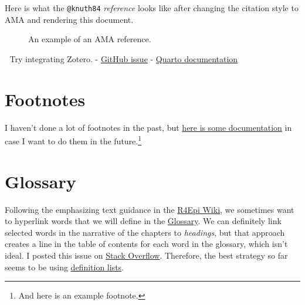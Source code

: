 \documentclass[
  letterpaper,
  DIV=11,
  numbers=noendperiod]{scrreprt}
\begin{document}
Here is what the \texttt{@knuth84} \emph{reference} looks like after
changing the citation style to AMA and rendering this document.

\begin{figure}


\caption{\label{fig-ama-reference}An example of an AMA reference.}

\end{figure}%

🔴 Try integrating Zotero. -
\href{https://github.com/orgs/brad-cannell/projects/3/views/4?pane=issue&itemId=75494998}{GitHub
issue} -
\href{https://quarto.org/docs/visual-editor/options.html\#citation-options}{Quarto
documentation}

\section{Footnotes}\label{footnotes}

I haven't done a lot of footnotes in the past, but
\href{https://quarto.org/docs/authoring/footnotes-and-citations.html\#footnotes}{here
is some documentation} in case I want to do them in the
future.\footnote{And here is an example footnote.}

\section{Glossary}\label{glossary}

Following the emphasizing text guidance in the
\href{https://github.com/brad-cannell/r4epi/wiki/Emphasizing-Text}{R4Epi
Wiki}, we sometimes want to hyperlink words that we will define in the
\href{../appendices/glossary.qmd}{Glossary}. We can definitely link
selected words in the narrative of the chapters to \emph{headings}, but
that approach creates a line in the table of contents for each word in
the glossary, which isn't ideal. I posted this issue on
\href{https://stackoverflow.com/questions/76691907/quarto-link-a-word-in-one-qmd-document-to-a-word-in-a-different-qmd-document/76719362\#76719362}{Stack
Overflow}. Therefore, the best strategy so far seems to be using
\href{https://pandoc.org/MANUAL.html\#definition-lists}{definition
lists}.
\end{document}
